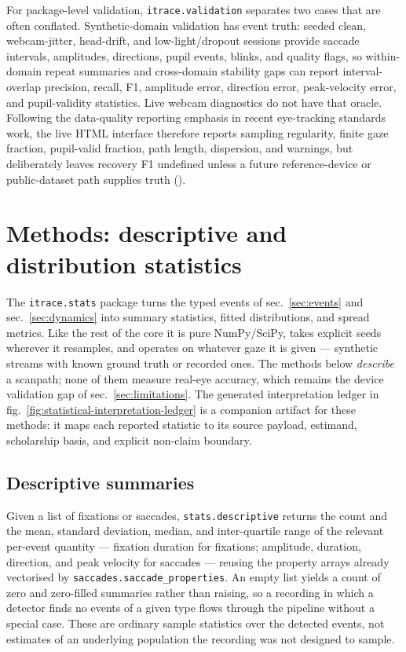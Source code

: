 \documentclass[
]{article}
\begin{document}
For package-level validation, \texttt{itrace.validation} separates two
cases that are often conflated. Synthetic-domain validation has event
truth: seeded clean, webcam-jitter, head-drift, and low-light/dropout
sessions provide saccade intervals, amplitudes, directions, pupil
events, blinks, and quality flags, so within-domain repeat summaries and
cross-domain stability gaps can report interval-overlap precision,
recall, F1, amplitude error, direction error, peak-velocity error, and
pupil-validity statistics. Live webcam diagnostics do not have that
oracle. Following the data-quality reporting emphasis in recent
eye-tracking standards work, the live HTML interface therefore reports
sampling regularity, finite gaze fraction, pupil-valid fraction, path
length, dispersion, and warnings, but deliberately leaves recovery F1
undefined unless a future reference-device or public-dataset path
supplies truth ().

\section{Methods: descriptive and distribution
statistics}\label{sec:diststats}

The \texttt{itrace.stats} package turns the typed events of
sec.~\ref{sec:events} and sec.~\ref{sec:dynamics} into summary
statistics, fitted distributions, and spread metrics. Like the rest of
the core it is pure NumPy/SciPy, takes explicit seeds wherever it
resamples, and operates on whatever gaze it is given --- synthetic
streams with known ground truth or recorded ones. The methods below
\emph{describe} a scanpath; none of them measure real-eye accuracy,
which remains the device validation gap of sec.~\ref{sec:limitations}.
The generated interpretation ledger in
fig.~\ref{fig:statistical-interpretation-ledger} is a companion artifact
for these methods: it maps each reported statistic to its source
payload, estimand, scholarship basis, and explicit non-claim boundary.

\subsection{Descriptive summaries}\label{descriptive-summaries}

Given a list of fixations or saccades, \texttt{stats.descriptive}
returns the count and the mean, standard deviation, median, and
inter-quartile range of the relevant per-event quantity --- fixation
duration for fixations; amplitude, duration, direction, and peak
velocity for saccades --- reusing the property arrays already vectorised
by \texttt{saccades.saccade\_properties}. An empty list yields a count
of zero and zero-filled summaries rather than raising, so a recording in
which a detector finds no events of a given type flows through the
pipeline without a special case. These are ordinary sample statistics
over the detected events, not estimates of an underlying population the
recording was not designed to sample.
\end{document}
